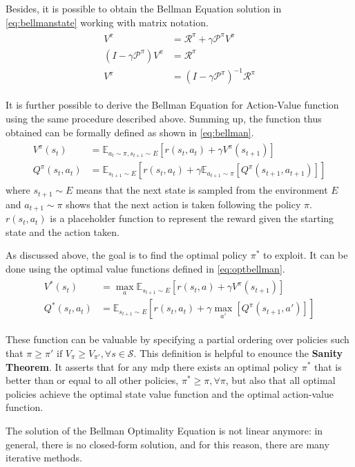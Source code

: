Besides, it is possible to obtain the Bellman Equation solution in \vref{eq:bellmanstate} working with matrix notation.
\begin{align} \label{eq:bellmanstate}
	\begin{split}
	V^\pi &= \mathcal{R}^\pi + \gamma \mathcal{P}^\pi V^\pi \\
	(I - \gamma\mathcal{P}^\pi)V^\pi &= \mathcal{R}^\pi \\
	V^\pi &= (I - \gamma\mathcal{P}^\pi)^{-1}\mathcal{R}^\pi
	\end{split}
\end{align}

It is further possible to derive the Bellman Equation for Action-Value function using the same procedure described above. Summing up, the function thus obtained can be formally defined as shown in \vref{eq:bellman}.
\begin{align} \label{eq:bellman}
	\begin{split}
V^\pi(s_t) &= \mathbb{E}_{a_t \sim \pi, s_{t+1} \sim E}[r(s_t, a_t) + \gamma V^\pi(s_{t+1})] \\
Q^\pi(s_t,a_t) &= \mathbb{E}_{s_{t+1} \sim E}[r(s_t, a_t) + \gamma \mathbb{E}_{ a_{t+1} \sim \pi}[Q^\pi(s_{t+1}, a_{t+1})]]
\end{split}
\end{align}
where $s_{t+1}\sim \mathit{E}$ means that the next state is sampled from the environment $E$ and $a_{t+1}\sim \pi$ shows that the next action is taken following the policy $\pi$. $r(s_t, a_t)$ is a placeholder function to represent the reward given the starting state and the action taken.

As discussed above, the goal is to find the optimal policy $\pi^*$ to exploit. It can be done using the optimal value functions defined in \vref{eq:optbellman}. 
\begin{align} \label{eq:optbellman}
\begin{split}
V^*(s_t) &= \max_{a} \mathbb{E}_{s_{t+1} \sim E}[r(s_t, a) + \gamma V^\pi(s_{t+1})] \\
Q^*(s_t,a_t) &= \mathbb{E}_{s_{t+1} \sim E}[r(s_t, a_t) + \gamma \max_{a'}[Q^\pi(s_{t+1}, a')]]
\end{split}
\end{align}

These function can be valuable by specifying a partial ordering over policies such that $\pi \ge \pi' \text{ if } V_\pi \ge V_{\pi'},\forall s \in \mathcal{S}$.
This definition is helpful to enounce the \textbf{Sanity Theorem}. It asserts that for any \gls{mdp} there exists an optimal policy $\pi^*$ that is better than or equal to all other policies, $\pi^* \ge \pi, \forall \pi$, but also that all optimal policies achieve the optimal state value function and the optimal action-value function.

The solution of the Bellman Optimality  Equation is not linear anymore: in general, there is no closed-form solution, and for this reason, there are many iterative methods.










